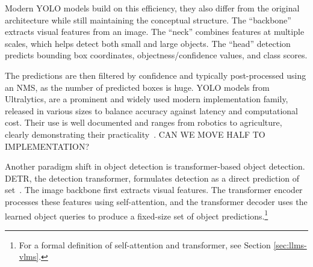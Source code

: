 Modern YOLO models build on this efficiency, they also differ from the original architecture while still maintaining the conceptual structure. The \enquote{backbone} extracts visual features from an image. The \enquote{neck} combines features at multiple scales, which helps detect both small and large objects. The \enquote{head} detection predicts bounding box coordinates, objectness/confidence values, and class scores.

The predictions are then filtered by confidence and typically post-processed using an NMS, as the number of predicted boxes is huge. YOLO models from Ultralytics, are a prominent and widely used modern implementation family, released in various sizes to balance accuracy against latency and computational cost. Their use is well documented and ranges from robotics to agriculture, clearly demonstrating their practicality~\cite[1, 4, 10--11]{sapkota_ultralytics_2026}. CAN WE MOVE HALF TO IMPLEMENTATION?



Another paradigm shift in object detection is transformer-based object detection. DETR, the detection transformer, formulates detection as a direct prediction of set~\cite{carion_end--end_2020}. The image backbone first extracts visual features. The transformer encoder processes these features using self-attention, and the transformer decoder uses the learned object queries to produce a fixed-size set of object predictions.\footnote{For a formal definition of self-attention and transformer, see Section \ref{sec:llms-vlms}.}



